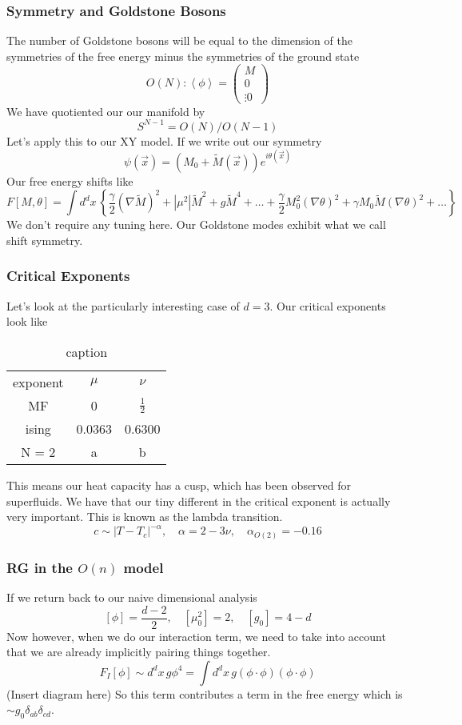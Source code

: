 \subsubsection{Symmetry and Goldstone Bosons} 
The number of Goldstone bosons will be equal to the 
dimension of the symmetries of the free energy
minus the symmetries of the ground state
\[
 O ( N ) : \left< \phi  \right>  = \begin{pmatrix} M \\ 0 \\ \vdots 0  \end{pmatrix} 
\] We have quotiented our our manifold by 
\[
	S ^{ N - 1 }  = O ( N ) / O ( N - 1) 
\] 
Let's apply this to our XY model. 
If we write out our symmetry 
\[
	\psi ( \vec{x} )  = \left(  M_ 0 + \tilde{ M } ( \vec{x} )   \right)  e^{ i \theta ( \vec{x} ) }
\] Our free energy shifts like
\[
 F [ M , \theta ]  = \int d ^ d x \, \left\{  
 \frac{\gamma }{ 2 } ( \nabla  \tilde{ M } ) ^ 2 + | \mu ^ 2 | \tilde{M} ^ 2 + 
 g \tilde{ M } ^ 4 + \dots + \frac{\gamma }{ 2 } M _0 ^ 2 ( \nabla \theta ) ^ 2 + 
 \gamma M _ 0 \tilde{ M } ( \nabla \theta ) ^ 2 + \dots \right\} 
\] We don't require any tuning here. Our Goldstone modes exhibit 
what we call shift symmetry. 

\subsubsection{Critical Exponents} 
Let's look at the particularly interesting 
case of $ d = 3 $. Our critical exponents look like
\begin{table}[htpb]
	\centering
	\caption{caption}
	\label{tab:label}
	\begin{tabular}{c c c }
		exponent & $ \mu $  & $ \nu $ \\
		MF & 0 & $ \frac{1}{2 }$ \\
                ising & 0.0363 & 0.6300 \\
		N = 2 &  a & b  \\ 
	\end{tabular}
\end{table}
This means our heat capacity has a cusp, 
which has been observed for superfluids. 
We have that our tiny different in the critical exponent is actually very important. 
This is known as the lambda transition. 
\[
	c \sim | T - T _ c |^{ - \alpha } , \quad \alpha   = 2 - 3 \nu , \quad \alpha _{ O ( 2) } = - 0.16 
\] 
\subsubsection{RG in the $ O ( n ) $ model} 
If we return back to our naive dimensional analysis 
\[
	[ \phi ] = \frac{ d - 2 }{ 2 }, \quad [ \mu _ 0 ^ 2 ] = 2 , \quad [ g _ 0 ] = 4 - d 
\] Now however, when 
we do our interaction term, we need to take into 
account that we are already implicitly pairing things 
together. 
\[
	F _ I [ \phi ] \sim d ^ d x \, g \phi ^ 4  = \int d ^ d x \, g ( \phi \cdot  \phi ) ( \phi \cdot  \phi ) 
\] (Insert diagram here) 
So this term contributes a term in the free energy which is $ \sim g_ 0 \delta _{ ab } \delta _{ cd } $. 


